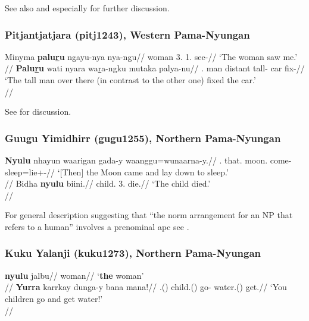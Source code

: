 \documentclass[A4paper]{article}
\begin{document}
See also \citealp[70]{reece1970} and especially \citealp[316f.]{hale1973} for further discussion.


\newpage

\subsubsection{Pitjantjatjara (pitj1243), Western Pama-Nyungan}

\pex
\a
\begingl
\gla Minyma \textbf{palu\underline{r}u} ngayu-nya nya-ngu//
\glb woman 3\Sg{}.\Nom{} 1\Sg{}.\Acc{} see-\Pst{}//
\glft `The woman saw me.' \\{\citep[31, (110)]{bowe1990}}//
\endgl
\a 
\begingl
\gla \textbf{Palu\underline{r}u} wati nyara wa\underline{r}a-ngku mutaka palya-nu//
\Sg{}.\Nom{} man distant tall-\Erg{} car fix-\Pst{}//
\glft `The tall man over there (in contrast to the other one) fixed the car.' \\{\citep[34, (114)]{bowe1990}}//
\endgl
\xe

See \citet[49--51]{bowe1990} for discussion.

\subsubsection{Guugu Yimidhirr (gugu1255), Northern Pama-Nyungan}

\pex
\a
\begingl
\gla \textbf{Nyulu} nhayun waarigan gada-y waanggu=wunaarna-y.//
\Sg.\Nom{} that.\Abs{} moon.\Abs{} come-\Pst{} sleep=lie+\Redup-\Pst//
\glft `[Then] the Moon came and lay down to sleep.'\\\citep[157, (423)]{haviland1979}//
\endgl
\a
\begingl
\gla Bidha \textbf{nyulu} biini.//
\glb child.\Abs{} 3\Sg.\Nom{} die.\Pst{}//
\glft `The child died.'\\\citep[157, (424a)]{haviland1979}//
\endgl
\xe

For general description suggesting that ``the norm arrangement for an NP that refers to a human'' involves a prenominal \gls{apc} see \citet[104]{haviland1979}.

\subsubsection{Kuku Yalanji (kuku1273), Northern Pama-Nyungan}

\pex
\a 
\begingl
\gla \textbf{nyulu} jalbu//
\Sg{} woman//
\glft `\textbf{the} woman'\\{\citep[after][202; gloss extrapolated]{patz2002}}//
\endgl
\a
\begingl
\gla \textbf{Yurra} karrkay dunga-y bana mana!//
\Pl{}.\Nom{}(\Sarg{}) child.\Abs{}(\Sarg{}) go-\Imp{} water.\Abs{}(\Obj{}) get.\Imp{}//
\glft `You children go and get water!' \\{\citep[after][203, (620)]{patz2002}}//
\endgl
\xe
\end{document}
